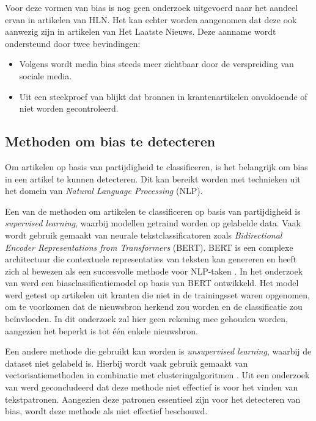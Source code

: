 Voor deze vormen van bias is nog geen onderzoek uitgevoerd naar het aandeel ervan in artikelen van HLN. Het kan echter worden aangenomen dat deze ook aanwezig zijn in artikelen van Het Laatste Nieuws. Deze aanname wordt ondersteund door twee bevindingen:

\begin{itemize}
    \item Volgens \textcite{RodrigoGines2024} wordt media bias steeds meer zichtbaar door de verspreiding van sociale media.
    \item Uit een steekproef van \textcite{Neveneffecten2011} blijkt dat bronnen in krantenartikelen onvoldoende of niet worden gecontroleerd.
\end{itemize}

\subsection{Methoden om bias te detecteren}

Om artikelen op basis van partijdigheid te classificeren, is het belangrijk om bias in een artikel te kunnen detecteren. Dit kan bereikt worden met technieken uit het domein van \textit{Natural Language Processing} (NLP).

Een van de methoden om artikelen te classificeren op basis van partijdigheid is \textit{supervised learning}, waarbij modellen getraind worden op gelabelde data. Vaak wordt gebruik gemaakt van neurale tekstclassificatoren zoals \textit{Bidirectional Encoder Representations from Transformers} (BERT). BERT is een complexe architectuur die contextuele representaties van teksten kan genereren en heeft zich al bewezen als een succesvolle methode voor NLP-taken \autocite{Baly2020}. In het onderzoek van \textcite{Baly2020} werd een biasclassificatiemodel op basis van BERT ontwikkeld. Het model werd getest op artikelen uit kranten die niet in de trainingsset waren opgenomen, om te voorkomen dat de nieuwsbron herkend zou worden en de classificatie zou beïnvloeden. In dit onderzoek zal hier geen rekening mee gehouden worden, aangezien het beperkt is tot één enkele nieuwsbron.

Een andere methode die gebruikt kan worden is \textit{unsupervised learning}, waarbij de dataset niet gelabeld is. Hierbij wordt vaak gebruik gemaakt van vectorisatiemethoden in combinatie met clusteringalgoritmen \autocite{UmarNadeem2022}. Uit een onderzoek van \textcite{UmarNadeem2022} werd geconcludeerd dat deze methode niet effectief is voor het vinden van tekstpatronen. Aangezien deze patronen essentieel zijn voor het detecteren van bias, wordt deze methode als niet effectief beschouwd.

